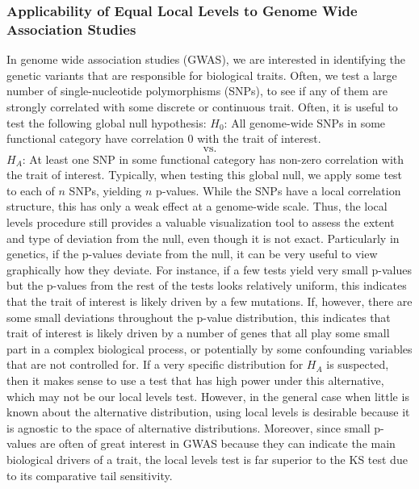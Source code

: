 \documentclass[article]{jss}
\begin{document}
\subsubsection{Applicability of Equal Local Levels to Genome Wide Association Studies}
In genome wide association studies (GWAS), we are interested in identifying the genetic variants that are responsible for biological traits. Often, we test a large number of single-nucleotide polymorphisms (SNPs), to see if any of them are strongly correlated with some discrete or continuous trait. Often, it is useful to test the following global null hypothesis:
\newline
\newline
$H_{0}$: All genome-wide SNPs in some functional category have correlation 0 with the trait of interest.
%
\begin{equation*}
\textrm{ vs. }
\end{equation*}
%
\noindent$H_{A}$: At least one SNP in some functional category has non-zero correlation with the trait of interest.
\newline
\newline
Typically, when testing this global null, we apply some test to each of $n$ SNPs, yielding $n$ p-values. While the SNPs have a local correlation structure, this has only a weak effect at a genome-wide scale. Thus, the local levels procedure still provides a valuable visualization tool to assess the extent and type of deviation from the null, even though it is not exact. Particularly in genetics, if the p-values deviate from the null, it can be very useful to view graphically how they deviate. For instance, if a few tests yield very small p-values but the p-values from the rest of the tests looks relatively uniform, this indicates that the trait of interest is likely driven by a few mutations. If, however, there are some small deviations throughout the p-value distribution, this indicates that trait of interest is likely driven by a number of genes that all play some small part in a complex biological process, or potentially by some confounding variables that are not controlled for.
\newline
\newline
If a very specific distribution for $H_{A}$ is suspected, then it makes sense to use a test that has high power under this alternative, which may not be our local levels test. However, in the general case when little is known about the alternative distribution, using local levels is desirable because it is agnostic to the space of alternative distributions. Moreover, since small p-values are often of great interest in GWAS because they can indicate the main biological drivers of a trait, the local levels test is far superior to the KS test due to its comparative tail sensitivity.
\end{document}
